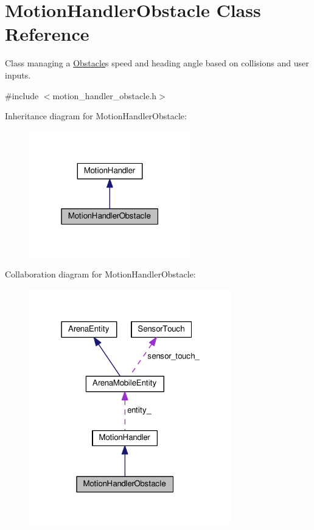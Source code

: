\hypertarget{classMotionHandlerObstacle}{}\section{Motion\+Handler\+Obstacle Class Reference}
\label{classMotionHandlerObstacle}


Class managing a \hyperlink{classObstacle}{Obstacle}\textquotesingle{}s speed and heading angle based on collisions and user inputs.  




{\ttfamily \#include $<$motion\+\_\+handler\+\_\+obstacle.\+h$>$}



Inheritance diagram for Motion\+Handler\+Obstacle\+:\nopagebreak
\begin{figure}[H]
\begin{center}
\leavevmode
\includegraphics[width=199pt]{classMotionHandlerObstacle__inherit__graph}
\end{center}
\end{figure}


Collaboration diagram for Motion\+Handler\+Obstacle\+:\nopagebreak
\begin{figure}[H]
\begin{center}
\leavevmode
\includegraphics[width=250pt]{classMotionHandlerObstacle__coll__graph}
\end{center}
\end{figure}
